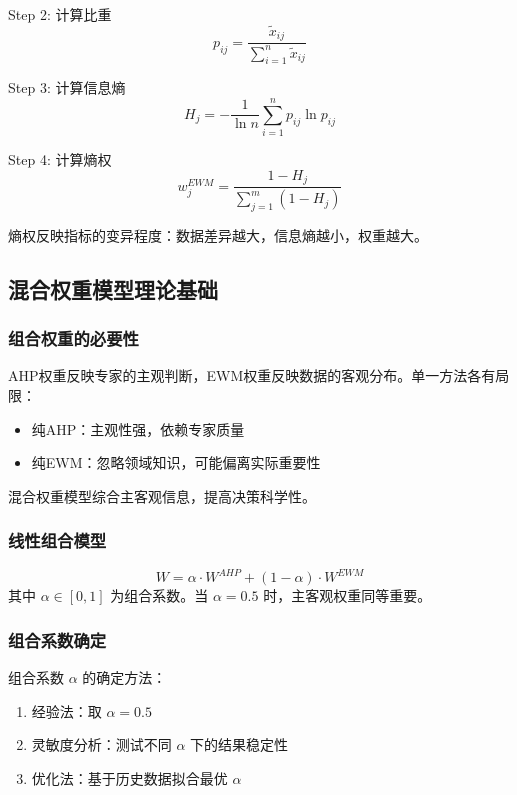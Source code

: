 Step 2: 计算比重
\begin{equation}
p_{ij} = \frac{\tilde{x}_{ij}}{\sum_{i=1}^{n} \tilde{x}_{ij}}
\label{eq:proportion}
\end{equation}

Step 3: 计算信息熵
\begin{equation}
H_j = -\frac{1}{\ln n} \sum_{i=1}^{n} p_{ij} \ln p_{ij}
\label{eq:info_entropy}
\end{equation}

Step 4: 计算熵权
\begin{equation}
w_j^{EWM} = \frac{1 - H_j}{\sum_{j=1}^{m} (1 - H_j)}
\label{eq:entropy_weight}
\end{equation}

熵权反映指标的变异程度：数据差异越大，信息熵越小，权重越大。

\subsection{混合权重模型理论基础}

\subsubsection{组合权重的必要性}

AHP权重反映专家的主观判断，EWM权重反映数据的客观分布。单一方法各有局限：
\begin{itemize}
\item 纯AHP：主观性强，依赖专家质量
\item 纯EWM：忽略领域知识，可能偏离实际重要性
\end{itemize}

混合权重模型综合主客观信息，提高决策科学性\cite{zhang2023risk}。

\subsubsection{线性组合模型}

\begin{equation}
W = \alpha \cdot W^{AHP} + (1 - \alpha) \cdot W^{EWM}
\label{eq:hybrid}
\end{equation}
其中 $\alpha \in [0,1]$ 为组合系数。当 $\alpha = 0.5$ 时，主客观权重同等重要。

\subsubsection{组合系数确定}

组合系数 $\alpha$ 的确定方法：
\begin{enumerate}
\item 经验法：取 $\alpha = 0.5$
\item 灵敏度分析：测试不同 $\alpha$ 下的结果稳定性
\item 优化法：基于历史数据拟合最优 $\alpha$
\end{enumerate}

